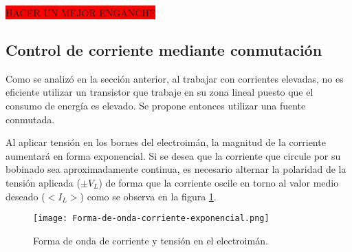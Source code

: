 \colorbox{red}{HACER UN MEJOR ENGANCHE}

\subsection{Control de corriente mediante conmutación}

Como se analizó en la sección anterior, al trabajar con corrientes elevadas, no es eficiente utilizar un transistor que trabaje en su zona lineal puesto que el consumo de energía es elevado. Se propone entonces utilizar una fuente conmutada.


Al aplicar tensión en los bornes del electroimán, la magnitud de la corriente aumentará en forma exponencial. Si se desea que la corriente que circule por su bobinado sea aproximadamente continua, es necesario alternar la polaridad de la tensión aplicada ($\pm V_L$) de forma que la corriente oscile en torno al valor medio deseado ($<I_L>$) como se observa en la figura \ref{fig:img_corriente_exponencial}.

\begin{figure}[H]
	\centering
	\texttt{[image: Forma-de-onda-corriente-exponencial.png]}
	\caption{Forma de onda de corriente y tensión en el electroimán.}
	\label{fig:img_corriente_exponencial}
\end{figure}


